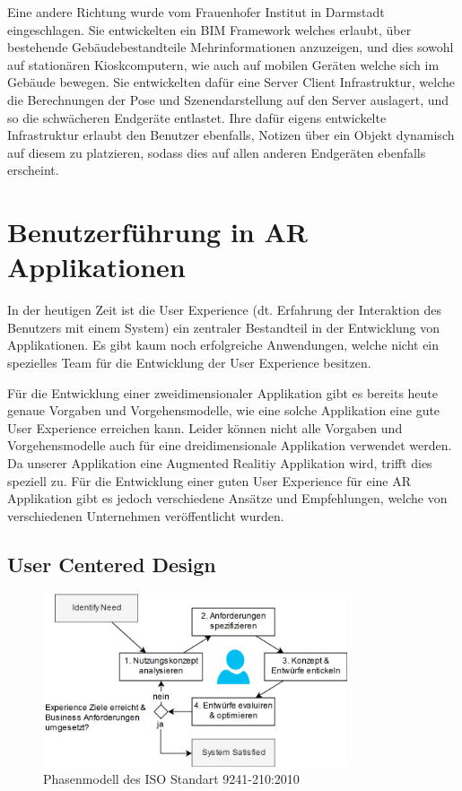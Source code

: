 \documentclass[a4paper]{scrreprt}
\begin{document}
Eine andere Richtung wurde vom Frauenhofer Institut in Darmstadt \parencite{Olbrich2013} eingeschlagen. Sie entwickelten ein BIM Framework welches erlaubt, über bestehende Gebäudebestandteile Mehrinformationen anzuzeigen, und dies sowohl auf stationären Kioskcomputern, wie auch auf mobilen Geräten welche sich im Gebäude bewegen. Sie entwickelten dafür eine Server Client Infrastruktur, welche die Berechnungen der Pose und Szenendarstellung auf den Server auslagert, und so die schwächeren Endgeräte entlastet. Ihre dafür eigens entwickelte Infrastruktur erlaubt den Benutzer ebenfalls, Notizen über ein Objekt dynamisch auf diesem zu platzieren, sodass dies auf allen anderen Endgeräten ebenfalls erscheint.

\section{Benutzerführung in AR Applikationen}
In der heutigen Zeit ist die User Experience (dt. Erfahrung der Interaktion des Benutzers mit einem System) ein zentraler Bestandteil in der Entwicklung von Applikationen. Es gibt kaum noch erfolgreiche Anwendungen, welche nicht ein spezielles Team für die Entwicklung der User Experience besitzen.

Für die Entwicklung einer zweidimensionaler Applikation gibt es bereits heute genaue Vorgaben und Vorgehensmodelle, wie eine solche Applikation eine gute User Experience erreichen kann. Leider können nicht alle Vorgaben und Vorgehensmodelle auch für eine dreidimensionale Applikation verwendet werden. Da unserer Applikation eine Augmented Realitiy Applikation wird, trifft dies speziell zu.
Für die Entwicklung einer guten User Experience für eine AR Applikation gibt es jedoch verschiedene Ansätze und Empfehlungen, welche von verschiedenen Unternehmen veröffentlicht wurden. 

\subsection{User Centered Design}
\begin{figure}[h!]
	\centering
	\includegraphics[keepaspectratio,width=0.8\textwidth]{UserCenteredDesign}
	\caption{Phasenmodell des ISO Standart 9241-210:2010 \parencite{ISO9241}}
\end{figure}
\end{document}
